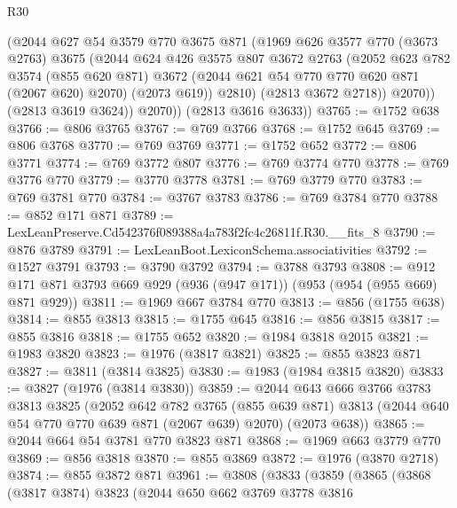 \begin{lexlean}{R30}
\begin{coremodule}
              (@2044
                @627
                @54
                @3579
                @770
                @3675
                @871
                (@1969
                  @626
                  @3577
                  @770
                  (@3673 @2763)
                  @3675
                  (@2044
                    @624
                    @426
                    @3575
                    @807
                    @3672
                    @2763
                    (@2052
                      @623
                      @782
                      @3574
                      (@855 @620 @871)
                      @3672
                      (@2044 @621 @54 @770 @770 @620 @871 (@2067 @620) @2070)
                      (@2073 @619))
                    @2810)
                  (@2813 @3672 @2718))
                @2070))
            (@2813 @3619 @3624))
          @2070))
      (@2813 @3616 @3633))
@3765 := @1752 @638
@3766 := @806 @3765
@3767 := @769 @3766
@3768 := @1752 @645
@3769 := @806 @3768
@3770 := @769 @3769
@3771 := @1752 @652
@3772 := @806 @3771
@3774 := @769 @3772 @807
@3776 := @769 @3774 @770
@3778 := @769 @3776 @770
@3779 := @3770 @3778
@3781 := @769 @3779 @770
@3783 := @769 @3781 @770
@3784 := @3767 @3783
@3786 := @769 @3784 @770
@3788 := @852 @171 @871
@3789 := LexLeanPreserve.Cd542376f089388a4a783f2fc4c26811f.R30.__fits_8
@3790 := @876 @3789
@3791 := LexLeanBoot.LexiconSchema.associativities
@3792 := @1527 @3791
@3793 := @3790 @3792
@3794 := @3788 @3793
@3808 := @912 @171 @871 @3793 @669 @929 (@936 (@947 @171)) (@953 (@954 (@955 @669) @871 @929))
@3811 := @1969 @667 @3784 @770
@3813 := @856 (@1755 @638)
@3814 := @855 @3813
@3815 := @1755 @645
@3816 := @856 @3815
@3817 := @855 @3816
@3818 := @1755 @652
@3820 := @1984 @3818 @2015
@3821 := @1983 @3820
@3823 := @1976 (@3817 @3821)
@3825 := @855 @3823 @871
@3827 := @3811 (@3814 @3825)
@3830 := @1983 (@1984 @3815 @3820)
@3833 := @3827 (@1976 (@3814 @3830))
@3859 := @2044
    @643
    @666
    @3766
    @3783
    @3813
    @3825
    (@2052
      @642
      @782
      @3765
      (@855 @639 @871)
      @3813
      (@2044 @640 @54 @770 @770 @639 @871 (@2067 @639) @2070)
      (@2073 @638))
@3865 := @2044 @664 @54 @3781 @770 @3823 @871
@3868 := @1969 @663 @3779 @770
@3869 := @856 @3818
@3870 := @855 @3869
@3872 := @1976 (@3870 @2718)
@3874 := @855 @3872 @871
@3961 := @3808
    (@3833
      (@3859
        (@3865
          (@3868
            (@3817 @3874)
            @3823
            (@2044
              @650
              @662
              @3769
              @3778
              @3816

\end{coremodule}
\end{lexlean}
